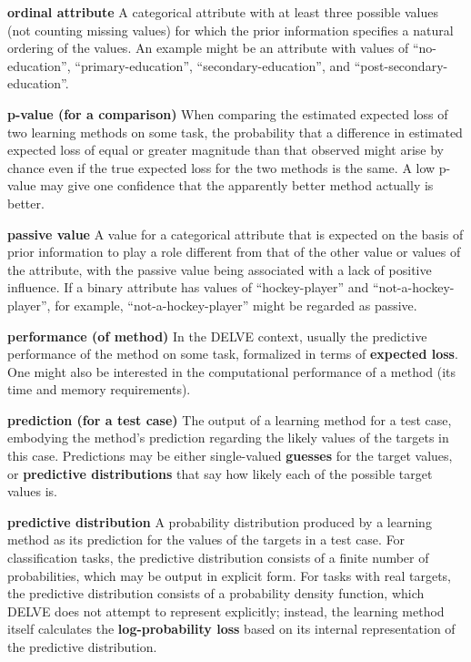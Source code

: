 \begin{list}{}{%
\setlength{\itemsep}{0in}%
\setlength{\leftmargin}{2.25in}%
\setlength{\labelsep}{0in}%
\setlength{\labelwidth}{2.25in}}
\item[\bf ordinal attribute \hfill]
A categorical attribute with at least three possible values (not
counting missing values) for which the prior information specifies a
natural ordering of the values.  An example might be an attribute with
values of ``no-education'', ``primary-education'', ``secondary-education'', 
and ``post-secondary-education''.

\item[\bf p-value (for a comparison) \hfill]
When comparing the estimated expected loss of two learning methods
on some task, the probability that a difference in estimated expected 
loss of equal or greater magnitude than that observed might arise by chance 
even if the true expected loss for the two methods is the same.  
A low p-value may give one confidence that the apparently better 
method actually is better.

\item[\bf passive value \hfill]
A value for a categorical attribute that is expected on the basis
of prior information to play a role different from that of the other
value or values of the attribute, with the passive value being
associated with a lack of positive influence.  If a
binary attribute has values of ``hockey-player'' and ``not-a-hockey-player'',
for example, ``not-a-hockey-player'' might be regarded as passive.

\item[\bf performance (of method) \hfill]
In the DELVE context, usually the predictive performance of the
method on some task, formalized in terms of {\bf expected loss}.
One might also be interested in the computational performance of a 
method (its time and memory requirements).

\item[\bf prediction (for a test case) \hfill]
The output of a learning method for a test case, embodying
the method's prediction regarding the likely values of the
targets in this case.  Predictions may be either single-valued 
{\bf guesses} for the target values, or {\bf predictive distributions} 
that say how likely each of the possible target values is.

\item[\bf predictive distribution \hfill]
A probability distribution produced by a learning method as its
prediction for the values of the targets in a test case.
For classification tasks, the predictive distribution consists of
a finite number of probabilities, which may be output in explicit form.
For tasks with real targets, the predictive distribution consists of
a probability density function, which DELVE does not attempt to
represent explicitly; instead, the learning method itself calculates 
the {\bf log-probability loss} based on its internal representation of 
the predictive distribution.


\end{list}
